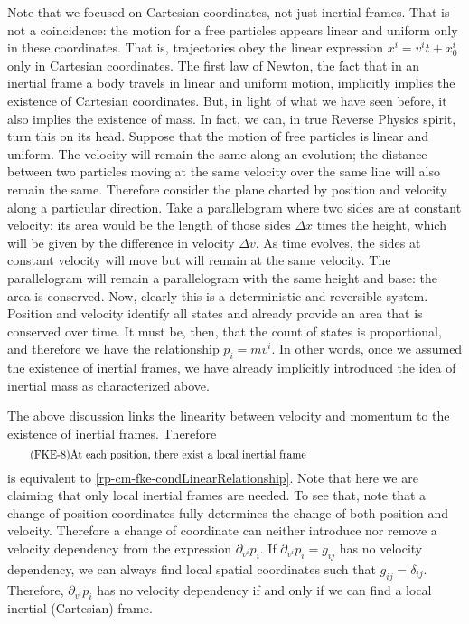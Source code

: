 Note that we focused on Cartesian coordinates, not just inertial frames. That is not a coincidence: the motion for a free particles appears linear and uniform only in these coordinates. That is, trajectories obey the linear expression $x^i = v^i t + x_0^i$ only in Cartesian coordinates. The first law of Newton, the fact that in an inertial frame a body travels in linear and uniform motion, implicitly implies the existence of Cartesian coordinates. But, in light of what we have seen before, it also implies the existence of mass. In fact, we can, in true Reverse Physics spirit, turn this on its head. Suppose that the motion of free particles is linear and uniform. The velocity will remain the same along an evolution; the distance between two particles moving at the same velocity over the same line will also remain the same. Therefore consider the plane charted by  position and velocity along a particular direction. Take a parallelogram where two sides are at constant velocity: its area would be the length of those sides $\Delta x$ times the height, which will be given by the difference in velocity $\Delta v$. As time evolves, the sides at constant velocity will move but will remain at the same velocity. The parallelogram will remain a parallelogram with the same height and base: the area is conserved. Now, clearly this is a deterministic and reversible system. Position and velocity identify all states and already provide an area that is conserved over time. It must be, then, that the count of states is proportional, and therefore we have the relationship $p_i=mv^i$. In other words, once we assumed the existence of inertial frames, we have already implicitly introduced the idea of inertial mass as characterized above.

The above discussion links the linearity between velocity and momentum to the existence of inertial frames. Therefore
\begin{equation}
	\tag{FKE-8}\label{rp-cm-fke-condInertial}
	\parbox{5in}{At each position, there exist a local inertial frame}
\end{equation}
is equivalent to \ref{rp-cm-fke-condLinearRelationship}. Note that here we are claiming that only local inertial frames are needed. To see that, note that a change of position coordinates fully determines the change of both position and velocity. Therefore a change of coordinate can neither introduce nor remove a velocity dependency from the expression $\partial_{v^i} p_i$. If $\partial_{v^i} p_i = g_{ij}$ has no velocity dependency, we can always find local spatial coordinates such that $g_{ij}=\delta_{ij}$. Therefore, $\partial_{v^i} p_i$ has no velocity dependency if and only if we can find a local inertial (Cartesian) frame.

